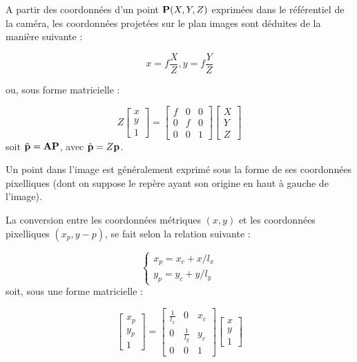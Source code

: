 A partir des coordonnées d'un point ${\bf P}(X, Y, Z)$ exprimées dans le référentiel de la caméra, les coordonnées projetées sur le plan images sont déduites de la manière suivante :

\begin{equation}
x = f \frac{X}{Z}, y = f \frac{Y}{Z}
\label{intro:eq12}
\end{equation}

ou, sous forme matricielle :

\begin{equation}
Z
\begin{bmatrix}
x \\y \\ 1
\end{bmatrix}
=
\begin{bmatrix}
f & 0 & 0 \\ 0 & f & 0 \\ 0 & 0 & 1 
\end{bmatrix}
\begin{bmatrix}
X \\ Y \\ Z 
\end{bmatrix}
\label{intro:eq13}
\end{equation}
soit $\tilde {\bf p} = {\bf A}{\bf P}$, avec $\tilde {\bf p} = Z {\bf p}$.

Un point dans l'image est généralement exprimé sous la forme de ses coordonnées pixelliques (dont on suppose le repère ayant son origine en haut à gauche de l'image).

La conversion entre les coordonnées métriques $(x, y)$ et les coordonnées pixelliques $(x_p, y-p)$, se fait selon la relation suivante :

\begin{equation}
\left \lbrace
\begin{matrix}
x_p = x_c + x/l_x \\
y_p = y_c + y/l_y
\end{matrix} \right .
\label{intro:eq14}
\end{equation}
soit, sous une forme matricielle :

\begin{equation}
\begin{bmatrix}
x_p \\y_p \\ 1
\end{bmatrix}
=
\begin{bmatrix}
\frac 1 {l_x} & 0 & x_c \\ 0 & \frac 1 {l_y} & y_c \\ 0 & 0 & 1 
\end{bmatrix}
\begin{bmatrix}
x \\ y \\ 1
\end{bmatrix}
\label{intro:eq15}
\end{equation}







